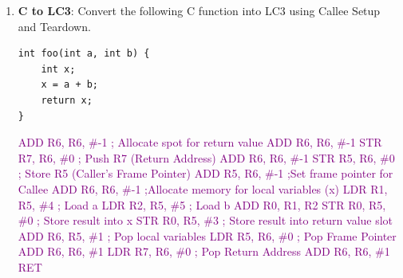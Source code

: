 \documentclass{article}
\begin{document}
\begin{enumerate}[label=(\alph*)]
\item \textbf{C to LC3}: Convert the following C function into LC3 using Callee Setup and Teardown.
    \begin{lstlisting}[style=CStyle] 
int foo(int a, int b) {
    int x;
    x = a + b;
    return x;
}\end{lstlisting}
    \textcolor{purple}{
    ADD R6, R6, \#-1 \hfill ; Allocate spot for return value\newline
    ADD R6, R6, \#-1  \newline
    STR R7, R6, \#0    \hfill ; Push R7 (Return Address) \newline
    ADD R6, R6, \#-1  \newline
    STR R5, R6, \#0    \hfill ; Store R5 (Caller's Frame Pointer) \newline
    ADD R5, R6, \#-1 \hfill ;Set frame pointer for Callee \newline
    ADD R6, R6, \#-1 \hfill ;Allocate memory for local variables (x) \newline
    LDR R1, R5, \#4 \hfill ; Load a \newline 
    LDR R2, R5, \#5 \hfill ; Load b\newline
    ADD R0, R1, R2 \newline 
    STR R0, R5, \#0 \hfill ; Store result into x \newline
    STR R0, R5, \#3 \hfill ; Store result into return value slot \newline
    ADD R6, R5, \#1 \hfill ; Pop local variables\newline
    LDR R5, R6, \#0 \hfill ; Pop Frame Pointer\newline
    ADD R6, R6, \#1 \newline
    LDR R7, R6, \#0 \hfill ; Pop Return Address\newline
    ADD R6, R6, \#1 \newline
    RET
    \newline
}

    
\end{enumerate} 
\end{document}
